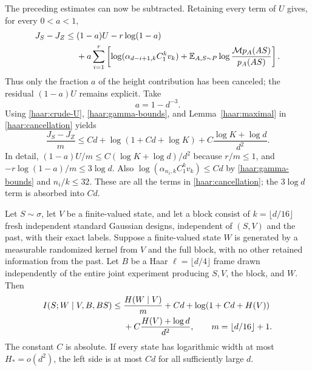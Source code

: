 The preceding estimates can now be subtracted.  Retaining every term of
$U$ gives, for every $0<a<1$,
\begin{align}
 J_S-J_Z\le{}&(1-a)U-r\log(1-a)\notag\\
 &+a\sum_{i=1}^r\left[
       \log(\alpha_{d-i+1,k}C_1^kv_k)
       +\mathbb E_{A,S\sim P}
          \log\frac{\mathcal M p_A(AS)}{p_A(AS)}\right].
 \label{haar:cancellation}
\end{align}
Thus only the fraction $a$ of the height contribution has been canceled;
the residual $(1-a)U$ remains explicit.  Take
\begin{equation}\label{haar:a-choice}
 a=1-d^{-3}.
\end{equation}
Using \eqref{haar:crude-U}, \eqref{haar:gamma-bounds}, and
Lemma~\ref{haar:maximal} in \eqref{haar:cancellation} yields
\begin{equation}\label{haar:fixed-prior-budget}
 \frac{J_S-J_Z}{m}
 \le Cd+\log(1+Cd+\log K)
       +C\frac{\log K+\log d}{d^2}.
\end{equation}
In detail, $(1-a)U/m\le C(\log K+\log d)/d^2$ because $r/m\le1$,
and $-r\log(1-a)/m\le3\log d$.  Also
$\log(\alpha_{n_i,k}C_1^kv_k)\le Cd$ by
\eqref{haar:gamma-bounds} and $n_i/k\le32$.  These are all the terms in
\eqref{haar:cancellation}; the $3\log d$ term is absorbed into $Cd$.

\begin{proposition}\label{haar:block}
Let $S\sim\sigma$, let $V$ be a finite-valued state, and let a block
consist of $k=\lfloor d/16\rfloor$ fresh independent standard Gaussian
designs, independent of $(S,V)$ and the past, with their exact labels.
Suppose a finite-valued state $W$ is
generated by a measurable randomized kernel from $V$ and the full block,
with no other retained information from the past.  Let $B$ be a Haar
$\ell=\lfloor d/4\rfloor$ frame drawn independently of the entire joint
experiment producing $S,V$, the block, and $W$.  Then
\begin{align}
 I(S;W\mid V,B,BS)\le{}&\frac{H(W\mid V)}{m}+Cd
       +\log(1+Cd+H(V))\notag\\
 &+C\frac{H(V)+\log d}{d^2},
 \qquad m=\lfloor d/16\rfloor+1.
 \label{haar:state-budget}
\end{align}
The constant $C$ is absolute.  If every state has logarithmic width at
most $H_*=o(d^2)$, the left side is at most $Cd$ for all sufficiently
large $d$.
\end{proposition}

